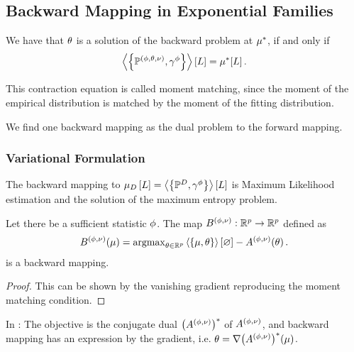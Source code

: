 \subsection{Backward Mapping in Exponential Families}



	We have that $\theta$ is a solution of the backward problem at $\mu^*$, if and only if 
		\[ \left\langle \left\{\mathbb{P}^{(\phi,\theta,\nu)},\gamma^{\phi}\right\}\right\rangle \left[ L \right] = \mu^*[L] \, . \]

This contraction equation is called moment matching, since the moment of the empirical distribution is matched by the moment of the fitting distribution.

We find one backward mapping as the dual problem to the forward mapping.


\subsubsection{Variational Formulation}

The backward mapping to $\mu_{D}\left[L\right] = \left\langle \left\{\mathbb{P}^{D},\gamma^{\phi}\right\}\right\rangle \left[ L \right]$ is Maximum Likelihood estimation and the solution of the maximum entropy problem.

\begin{lemma}
	Let there be a sufficient statistic $\phi$.
	The map $B^{(\phi,\nu)}: \mathbb{R}^{p}\rightarrow \mathbb{R}^{p}$ defined as
	\begin{align*}
		B^{(\phi,\nu)}(\mu)
		= \mathrm{argmax}_{\theta\in\mathbb{R}^{p}}  \left\langle \left\{\mu,\theta\right\}\right\rangle \left[ \varnothing \right] - A^{(\phi,\nu)}(\theta) \, . 
	\end{align*}
	is a backward mapping.
\end{lemma}
\begin{proof}
	This can be shown by the vanishing gradient reproducing the moment matching condition.
\end{proof}

In \cite{wainwright_graphical_2008}:
 The objective is the conjugate dual $\big(A^{(\phi,\nu)}\big)^*$ of $A^{(\phi,\nu)}$, and backward mapping has an expression by the gradient, i.e. $\theta = \nabla \big(A^{(\phi,\nu)}\big)^*(\mu)$.






